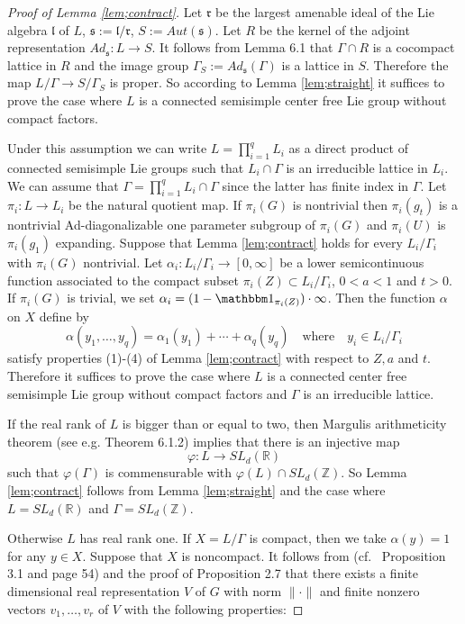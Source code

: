 \documentclass[12pt]{amsart}
\theoremstyle{definition}
\theoremstyle{remark}
\numberwithin{equation}{section}
\begin{document}
\begin{proof}[Proof of Lemma \ref{lem;contract}]
Let $\mathfrak {r}$ be the largest amenable ideal of the Lie algebra $\mathfrak l$  of $L$, $\mathfrak s:=\mathfrak l/\mathfrak r$,
$S:=Aut(\mathfrak s)$.
Let $R$ be the kernel of the  adjoint representation $Ad_{\mathfrak s}: L\to S$.
 It follows from  \cite{bq12} Lemma 6.1  that 
$\Gamma\cap R$ is a cocompact lattice  in $R$ and the image group $\Gamma_S:=Ad_{\mathfrak s}(\Gamma)$
is a lattice in $S$. Therefore the map
$
L/\Gamma\to S/\Gamma_S
$
is proper. So according to Lemma \ref{lem;straight}  it suffices to prove the case where $L$ is a connected semisimple center free Lie group without compact 
factors. 

Under this assumption we can write $L=\prod_{i=1}^qL_i$ as a direct product  of connected semisimple
Lie groups such that $L_i\cap \Gamma$ is an irreducible lattice in $L_i$.
We can 
 assume that $\Gamma=\prod_{i=1}^q L_i\cap \Gamma$ since the latter 
 has finite index in $\Gamma$. 
 Let $\pi_i: L\to L_i$ be the natural quotient map. 
If $\pi_i(G)$ is nontrivial then  $\pi_i(g_t)$ is a nontrivial  Ad-diagonalizable  one parameter subgroup 
of $\pi_i(G)$
and $\pi_i(U)$ is  $\pi_i(g_1)$ expanding.
Suppose that  Lemma \ref{lem;contract} holds for every $L_i/\Gamma_i$ with $\pi_i(G)$ nontrivial. 
Let $\alpha_i: L_i/\Gamma_i\to [0, \infty]$ be a lower semicontinuous
function   associated to the compact subset $\pi_i(Z)\subset L_i/\Gamma_i$,   
$0<a<1$ and $t>0$. If $\pi_i(G)$ is trivial, we set $\alpha_i=(1-\mathbbm 1_{\pi_i(Z)})\cdot \infty$.
Then the function $\alpha$ on $X$ define by
\[
\alpha(y_1, \ldots, y_q)= \alpha_1(y_1)+\cdots+\alpha_q(y_q)\quad
\mbox{where} \quad y_i\in L_i/\Gamma_i
\]
satisfy properties (1)-(4) of Lemma \ref{lem;contract} with respect to $Z, a$ and $t$.
Therefore it suffices  to prove  the case where $L$ is a connected  center free
semisimple Lie group without compact factors  and $\Gamma$ is an irreducible lattice. 

 If the real rank of $L$ is bigger than or equal to two, then Margulis arithmeticity theorem (see e.g. \cite{z} Theorem 6.1.2)
implies that there is an injective map \[
\varphi: L\to SL_d(\mathbb R)
\]
such that $\varphi(\Gamma)$ is commensurable with $\varphi(L)\cap SL_d(\mathbb Z)$.
So Lemma \ref{lem;contract} follows from Lemma \ref{lem;straight} and the case
where $L=SL_d(\mathbb R)$  and $\Gamma=SL_d(\mathbb Z)$.

Otherwise $L$ has real rank one.
If $X=L/\Gamma$ is compact, then we take $\alpha(y)=1$ for any $y\in X$.
Suppose that  $X$ is noncompact. 
 It follows from \cite{gr70} (cf.~\cite{kw} Proposition 3.1
and \cite{bq12} page 54) and the proof of  \cite{em04} Proposition 2.7 that there 
exists a finite dimensional real representation $V$ of $G$ with norm $\|\cdot\|$ and finite nonzero 
vectors  $v_1, \ldots, v_r$ of $V$
with the following properties: 


\end{proof}
\end{document}
